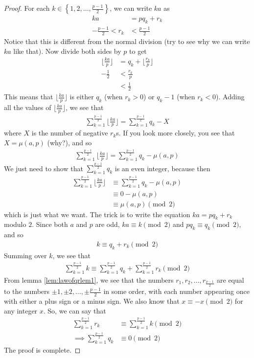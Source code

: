 \documentclass{subfile}
\begin{document}
\begin{proof}
	For each $k \in \left\{1, 2, \dots, \frac{p-1}{2} \right\}$, we can write $ka$ as
	\begin{align*}
		ka
			& = pq_k + r_k\\
		-\frac{p-1}{2}<r_k
			& < \frac{p-1}{2}
	\end{align*}
	Notice that this is different from the normal division (try to see why we can write $ka$ like that). Now divide both sides by $p$ to get
		\begin{align*}
			\Big\lfloor\frac{ka}{p} \Big\rfloor
				& = q_k + \Big\lfloor\frac{r_k}{p}\Big\rfloor\\
			-\frac{1}{2}
				& <\frac{r_k}{p}\\
				& < \frac{1}{2}
		\end{align*}
	This means that $\Big\lfloor\frac{ka}{p} \Big\rfloor$ is either $q_k$ (when $r_k >0$) or $q_k -1$ (when $r_k<0$). Adding all the values of $\Big\lfloor\frac{ka}{p} \Big\rfloor$, we see that
	\begin{align*}
		\sum_{k=1}^{\frac{p-1}{2}} \Big\lfloor\frac{ka}{p} \Big\rfloor = \sum_{k=1}^{\frac{p-1}{2}} q_k - X
	\end{align*}
	where $X$ is the number of negative $r_k$s. If you look more closely, you see that $X= \mu(a,p)$ (why?), and so
	\begin{align*}
	\sum_{k=1}^{\frac{p-1}{2}} \Big\lfloor\frac{ka}{p} \Big\rfloor = \sum_{k=1}^{\frac{p-1}{2}} q_k - \mu(a,p)
	\end{align*}
	We just need to show that $\sum_{k=1}^{\frac{p-1}{2}} q_k$ is an even integer, because then
	\begin{align*}
		\sum_{k=1}^{\frac{p-1}{2}} \Big\lfloor\frac{ka}{p} \Big\rfloor
			& \equiv \sum_{k=1}^{\frac{p-1}{2}} q_k - \mu(a,p)\\
			& \equiv 0 -  \mu(a,p)\\
			& \equiv  \mu(a,p) \pmod 2
	\end{align*}
	which is just what we want. The trick is to write the equation $ka = pq_k + r_k$ modulo $2$. Since both $a$ and $p$ are odd, $ka \equiv k \pmod 2$ and $pq_k \equiv q_k \pmod 2$, and so
	\begin{align*}
		k \equiv q_k + r_k \pmod 2
	\end{align*}
	Summing over $k$, we see that
	\begin{align*}
		\sum_{k=1}^{\frac{p-1}{2}}k \equiv \sum_{k=1}^{\frac{p-1}{2}} q_k + \sum_{k=1}^{\frac{p-1}{2}} r_k \pmod 2
	\end{align*}
	From lemma \eqref{lem:lawofqrlem1}, we see that the numbers $r_1, r_2, \ldots, r_{\frac{p-1}{2}}$ are equal to the numbers $\pm 1, \pm 2, \ldots, \pm \frac{p-1}{2}$ in some order, with each number appearing once with either a plus sign or a minus sign. We also know that $x \equiv -x \pmod 2$ for any integer $x$. So, we can say that
	\begin{align*}
		\sum_{k=1}^{\frac{p-1}{2}} r_k
			& \equiv \sum_{k=1}^{\frac{p-1}{2}}k \pmod 2\\
		\implies \sum_{k=1}^{\frac{p-1}{2}} q_k
			& \equiv 0 \pmod 2
	\end{align*}
	The proof is complete.
\end{proof}
\end{document}
